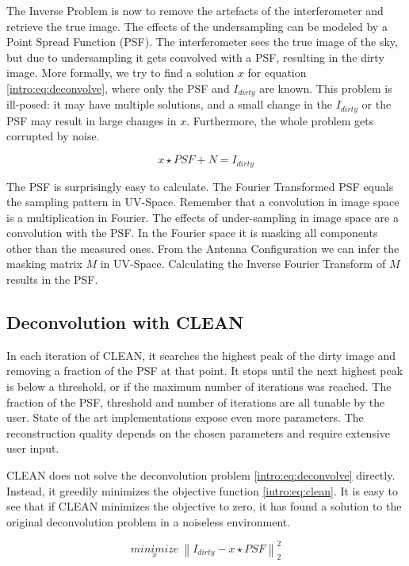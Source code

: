 The Inverse Problem is now to remove the artefacts of the interferometer and retrieve the true image. The effects of the undersampling can be modeled by a Point Spread Function (PSF). The interferometer sees the true image of the sky, but due to undersampling it gets convolved with a PSF, resulting in the dirty image.  More formally, we try to find a solution $x$ for equation \eqref{intro:eq:deconvolve}, where only the PSF and $I_{dirty}$ are known. This problem is ill-posed: it may have multiple solutions, and a small change in the $I_{dirty}$ or the PSF may result in large changes in $x$. Furthermore, the whole problem gets corrupted by noise.

\begin{equation}\label{intro:eq:deconvolve}
x \star  PSF + N = I_{dirty} 
\end{equation}

The PSF is surprisingly easy to calculate. The Fourier Transformed PSF equals the sampling pattern in UV-Space. Remember that a convolution in image space is a multiplication in Fourier. The effects of under-sampling in image space are a convolution with the PSF. In the Fourier space it is masking all components other than the measured ones. From the Antenna Configuration we can infer the masking matrix $M$ in UV-Space. Calculating the Inverse Fourier Transform of $M$ results in the PSF.


\subsection{Deconvolution with CLEAN}
In each iteration of CLEAN, it searches the highest peak of the dirty image and removing a fraction of the PSF at that point. It stops until the next highest peak is below a threshold, or if the maximum number of iterations was reached. The fraction of the PSF, threshold and number of iterations are all tunable by the user. State of the art implementations expose even more parameters. The reconstruction quality depends on the chosen parameters and require extensive user input.

CLEAN does not solve the deconvolution problem \eqref{intro:eq:deconvolve} directly. Instead, it greedily minimizes the objective function \eqref{intro:eq:clean}. It is easy to see that if CLEAN minimizes the objective to zero, it has found a solution to the original deconvolution problem in a noiseless environment.

\begin{equation}\label{intro:eq:clean}
\underset{x}{minimize} \: \left \| I_{dirty} - x \star PSF \right \|_2^2
\end{equation}

